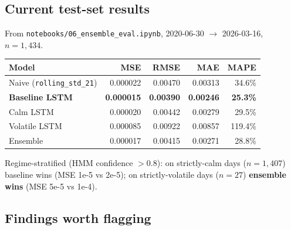 \documentclass[11pt]{article}
\begin{document}
\subsection*{Current test-set results}

From \texttt{notebooks/06\_ensemble\_eval.ipynb}, 2020-06-30 $\to$ 2026-03-16, $n=1{,}434$.

\begin{center}
\begin{tabular}{lrrrr}
\toprule
Model & MSE & RMSE & MAE & MAPE \\
\midrule
Naive (\texttt{rolling\_std\_21}) & 0.000022 & 0.00470 & 0.00313 & 34.6\% \\
\textbf{Baseline LSTM}            & \textbf{0.000015} & \textbf{0.00390} & \textbf{0.00246} & \textbf{25.3\%} \\
Calm LSTM                         & 0.000020 & 0.00442 & 0.00279 & 29.5\% \\
Volatile LSTM                     & 0.000085 & 0.00922 & 0.00857 & 119.4\% \\
Ensemble                          & 0.000017 & 0.00415 & 0.00271 & 28.8\% \\
\bottomrule
\end{tabular}
\end{center}

Regime-stratified (HMM confidence $> 0.8$): on strictly-calm days ($n=1{,}407$) baseline wins (MSE 1e-5 vs 2e-5); on strictly-volatile days ($n=27$) \textbf{ensemble wins} (MSE 5e-5 vs 1e-4).

\subsection*{Findings worth flagging}
\end{document}
